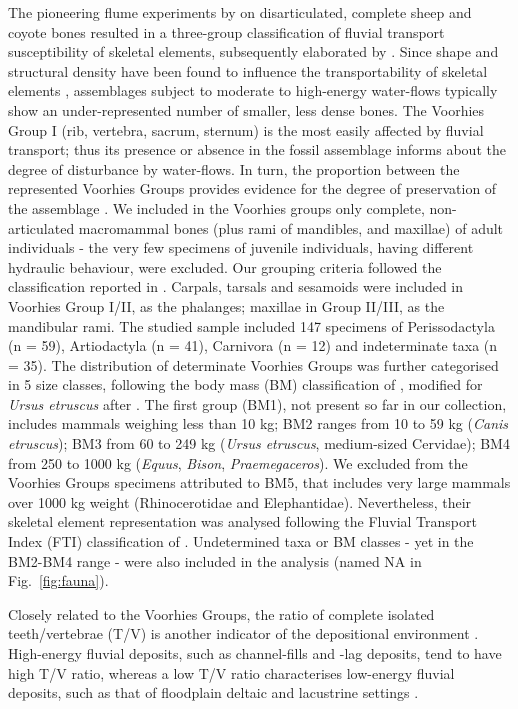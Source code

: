 \documentclass[5p,times,authoryear]{elsarticle}
\begin{document}
The pioneering flume experiments by \cite{Voorhies1969} on disarticulated, complete sheep and coyote bones resulted in a three-group classification of fluvial transport susceptibility of skeletal elements, subsequently elaborated by \cite{Behrensmeyer1975a}. Since shape and structural density have been found to influence the transportability of skeletal elements \citep{Behrensmeyer1975a,Boaz1982}, assemblages subject to moderate to high-energy water-flows typically show an under-represented number of smaller, less dense bones. The Voorhies Group I (rib, vertebra, sacrum, sternum) is the most easily affected by fluvial transport; thus its presence or absence in the fossil assemblage informs about the degree of disturbance by water-flows. In turn, the proportion between the represented Voorhies Groups provides evidence for the degree of preservation of the assemblage \citep{Behrensmeyer1975a}. We included in the Voorhies groups only complete, non-articulated macromammal bones (plus rami of mandibles, and maxillae) of adult individuals - the very few specimens of juvenile individuals, having different hydraulic behaviour, were excluded. Our grouping criteria followed the classification reported in \citet[][Tab.6.5]{Lyman1994}. Carpals, tarsals and sesamoids were included in Voorhies Group I/II, as the phalanges; maxillae in Group II/III, as the mandibular rami. The studied sample included 147 specimens of Perissodactyla (n = 59), Artiodactyla (n = 41), Carnivora (n = 12) and indeterminate taxa (n = 35). The distribution of determinate Voorhies Groups was further categorised in 5 size classes, following the body mass (BM) classification of \cite{Palombo2010,Palombo2016}, modified for \emph{Ursus etruscus} after \cite{Koufos}. The first group (BM1), not present so far in our collection, includes mammals weighing less than 10 kg; BM2 ranges from 10 to 59 kg (\emph{Canis etruscus}); BM3 from 60 to 249 kg (\emph{Ursus etruscus}, medium-sized Cervidae); BM4 from 250 to 1000 kg (\emph{Equus}, \emph{Bison}, \emph{Praemegaceros}). We excluded from the Voorhies Groups specimens attributed to BM5, that includes very large mammals over 1000 kg weight (Rhinocerotidae and Elephantidae). Nevertheless, their skeletal element representation was analysed following the Fluvial Transport Index (FTI) classification of \cite{Frison1986}. Undetermined taxa or BM classes - yet in the BM2-BM4 range - were also included in the analysis (named NA in Fig.~\ref{fig:fauna}).

Closely related to the Voorhies Groups, the ratio of complete isolated teeth/vertebrae (T/V) is another indicator of the depositional environment \citep{Behrensmeyer1975a}. High-energy fluvial deposits, such as channel-fills and -lag deposits, tend to have high T/V ratio, whereas a low T/V ratio characterises low-energy fluvial deposits, such as that of floodplain deltaic and lacustrine settings \citep{Lyman1994}.
\end{document}
